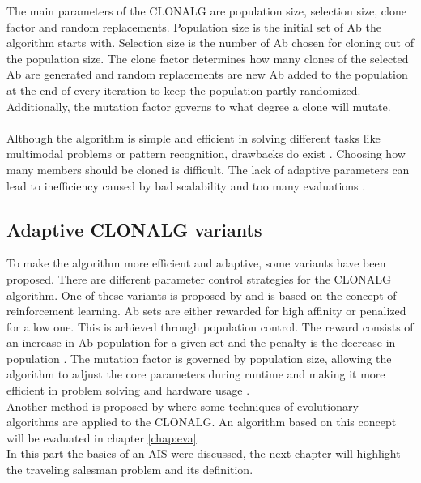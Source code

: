 The main parameters of the CLONALG are population size, selection size, clone factor and random replacements. Population size is the initial set of Ab the algorithm starts with. Selection size is the number of Ab chosen for cloning out of the population size. The clone factor determines how many clones of the selected Ab are generated and random replacements are new Ab added to the population at the end of every iteration to keep the population partly randomized. Additionally, the mutation factor governs to what degree a clone will mutate.\\\\
Although the algorithm is simple and efficient in solving different tasks like multimodal problems or pattern recognition, drawbacks do exist \cite{Garret04}. Choosing how many members should be cloned is difficult. The lack of adaptive parameters can lead to inefficiency caused by bad scalability and too many evaluations \cite{Garret04}.
\subsection{Adaptive CLONALG variants}
To make the algorithm more efficient and adaptive, some variants have been proposed. There are different parameter control strategies for the CLONALG algorithm. One of these variants is proposed by \cite{RIFF09} and is based on the concept of reinforcement learning. Ab sets are either rewarded for high affinity or penalized for a low one. This is achieved through population control. The reward consists of an increase in Ab population for a given set and the penalty is the decrease in population \cite{RIFF09}. The mutation factor is governed by population size, allowing the algorithm to adjust the core parameters during runtime and making it more efficient in problem solving and hardware usage \cite{RIFF09}.\\
Another method is proposed by \cite{Garret04} where some techniques of evolutionary algorithms are applied to the CLONALG. An algorithm based on this concept will be evaluated in chapter \ref{chap:eva}.\\
In this part the basics of an AIS were discussed, the next chapter will highlight the traveling salesman problem and its definition.
 




